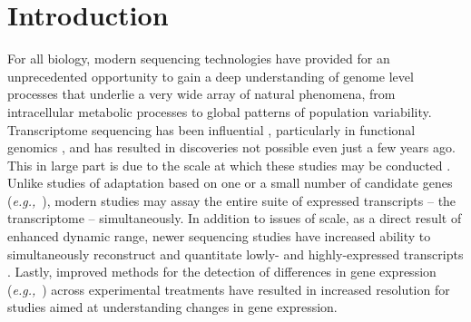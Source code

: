 \documentclass[10pt,letterpaper]{article}
\newcommand{\eg}{\textit{e.g.,}}
\begin{document}
\section{Introduction}

For all biology, modern sequencing technologies have provided for an unprecedented opportunity to gain a deep understanding of genome level processes that underlie a very wide array of natural phenomena, from intracellular metabolic processes to global patterns of population variability. Transcriptome sequencing has been influential \citep{Mortazavi:2008jj,Wang:2009di}, particularly in functional genomics \citep{Lappalainen:2013el,Cahoy:2008hm}, and has resulted in discoveries not possible even just a few years ago. This in large part is due to the scale at which these studies may be conducted \citep{Li:2017bq, Tan:2017ix}. Unlike studies of adaptation based on one or a small number of candidate genes (\eg\ \citep{Fitzpatrick:2005vd,Panhuis:2006kp}), modern studies may assay the entire suite of expressed transcripts -- the transcriptome -- simultaneously. In addition to issues of scale, as a direct result of enhanced dynamic range, newer sequencing studies have increased ability to simultaneously reconstruct and quantitate lowly- and highly-expressed transcripts \citep{Wolf:2013hd,Vijay:2012gy}. Lastly, improved methods for the detection of differences in gene expression (\eg\ \citep{Robinson:2010cw,Love:2014cf}) across experimental treatments have resulted in increased resolution for studies aimed at understanding changes in gene expression.    \\
\end{document}

